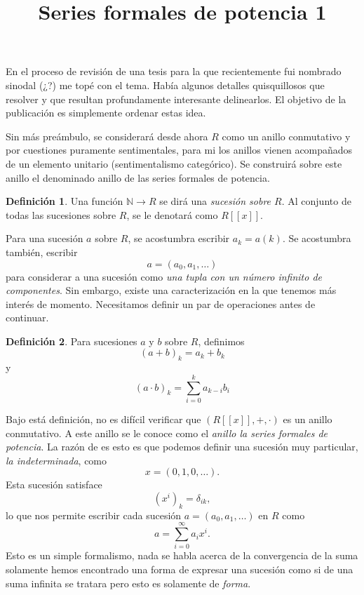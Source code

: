 \documentclass[letter,10pt,notitlepage]{article}
\title{Series formales de potencia 1}
\date{}
\theoremstyle{definition}
\newtheorem{definition}{Definición}
\theoremstyle{remark}
\begin{document}
\maketitle

En el proceso de revisión de una tesis para la que 
recientemente fui nombrado sinodal (¿?) me topé con 
el tema. Había algunos detalles quisquillosos que resolver
y que resultan profundamente interesante delinearlos. 
El objetivo de la publicación es simplemente ordenar 
estas idea.

Sin más preámbulo, se considerará desde ahora \( R\) 
como un anillo conmutativo y por cuestiones puramente 
sentimentales, para mi los anillos vienen acompañados de 
un elemento unitario (sentimentalismo categórico). 
Se construirá sobre este anillo el denominado anillo 
de las series formales de potencia.

\begin{definition}
  Una función \( \mathbb{N} \to R \) se dirá una 
  \emph{sucesión sobre \( R\)}. Al conjunto de todas 
  las sucesiones sobre \(R\), se le denotará como 
  \( R[[x]]\).
\end{definition}

Para una sucesión \(a\) sobre \(R\), se acostumbra 
escribir \(a_k = a(k)\). Se acostumbra también, escribir
\[ a = (a_0,a_1, \dots )\]
para considerar a una sucesión como 
\emph{una tupla con un número infinito de componentes}. 
Sin embargo, existe una caracterización en la que tenemos 
más interés de momento. Necesitamos definir un par de 
operaciones antes de continuar.

\begin{definition}
  Para sucesiones \(a\) y \(b\) sobre \(R\), definimos
  \[ (a + b)_k = a_k + b_k \]
  y
  \[ (a \cdot b)_k = \sum_{i=0}^ka_{k-i}b_{i}\]
\end{definition}

Bajo está definición, no es difícil verificar que 
\( (R[[x]],+,\cdot) \) es un anillo conmutativo. 
A este anillo se le conoce como el \emph{anillo la 
series formales de potencia}. La razón de es esto es 
que podemos definir una sucesión muy particular, 
\emph{la indeterminada}, como
\[ x = (0,1,0,\ldots).\]
Esta sucesión satisface
\[ (x^i)_k = \delta_{ik},\]
lo que nos permite escribir cada sucesión 
\( a = (a_0, a_1, \ldots)\) en \( R\) como
\[ a = \sum_{i=0}^{\infty}a_ix^i.\]
Esto es un simple formalismo, nada se habla acerca 
de la convergencia de la suma solamente hemos encontrado una
forma de expresar una sucesión como si de una suma 
infinita se tratara pero esto es solamente de \emph{forma}.
\end{document}
